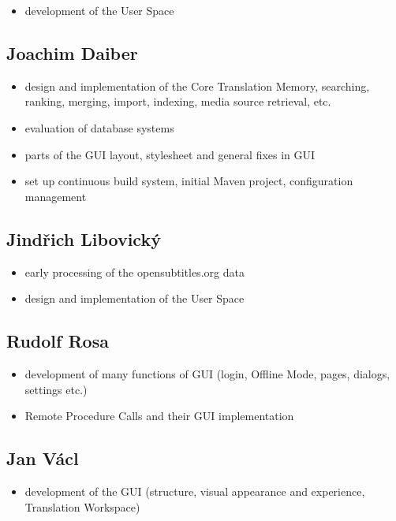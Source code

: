 \begin{itemize}
	\item development of the User Space
\end{itemize}

\subsection*{Joachim Daiber}

\begin{itemize}
	\item design and implementation of the Core Translation Memory, searching, ranking, merging, import, indexing, media source retrieval, etc.
	\item evaluation of database systems
	\item parts of the GUI layout, stylesheet and general fixes in GUI
	\item set up continuous build system, initial Maven project, configuration management
\end{itemize}



\subsection*{Jindřich Libovický}

\begin{itemize}
	\item early processing of the opensubtitles.org data
	\item design and implementation of the User Space
\end{itemize}


\subsection*{Rudolf Rosa}

\begin{itemize}
	\item development of many functions of GUI (login, Offline Mode, pages, dialogs, settings etc.)
	\item Remote Procedure Calls and their GUI implementation
\end{itemize}


\subsection*{Jan Václ}

\begin{itemize}
	\item development of the GUI (structure, visual appearance and experience, Translation Workspace)
\end{itemize}


